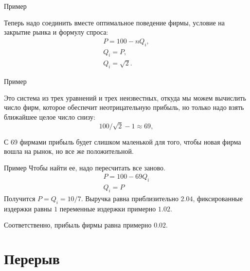 \documentclass{beamer}
\begin{document}
\begin{frame}{Пример}

Теперь надо соединить вместе оптимальное поведение фирмы, условие на закрытие рынка и формулу спроса:
\begin{gather*}
P = 100 - n Q_i,\\
Q_i = P,\\
Q_i = \sqrt{2}.
\end{gather*}

\end{frame}

\begin{frame}{Пример}

Это система из трех уравнений и трех неизвестных, откуда мы можем вычислить число фирм, которое обеспечит неотрицательную прибыль, но только надо взять ближайшее целое число снизу:
$$100/\sqrt{2} - 1 \approx 69,$$

С 69 фирмами прибыль будет слишком маленькой для того, чтобы новая фирма вошла на рынок, но все же положительной.

\end{frame}

\begin{frame}{Пример}
Чтобы найти ее, надо пересчитать все заново.
\begin{gather*}
P = 100 - 69 Q_i\\
Q_i = P
\end{gather*}
Получится $P = Q_i = 10/7$. Выручка равна приблизительно $2.04$, фиксированные издержки равны $1$ переменные издержки примерно $1.02$. 

Соответственно, прибыль фирмы равна примерно $0.02$.

\end{frame}

\section{Перерыв}
\end{document}
